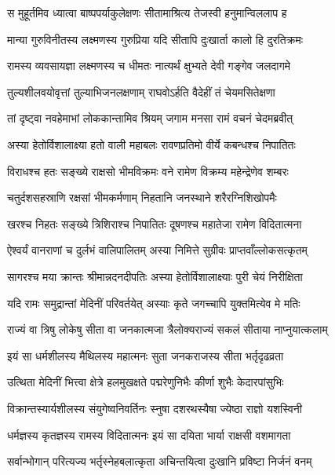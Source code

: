\twolineshloka
{स मुहूर्तमिव ध्यात्वा बाष्पपर्याकुलेक्षणः}
{सीतामाश्रित्य तेजस्वी हनुमान्विललाप ह} %

\twolineshloka
{मान्या गुरुविनीतस्य लक्ष्मणस्य गुरुप्रिया}
{यदि सीतापि दुःखार्ता कालो हि दुरतिक्रमः} %

\twolineshloka
{रामस्य व्यवसायज्ञा लक्ष्मणस्य च धीमतः}
{नात्यर्थं क्षुभ्यते देवी गङ्गेव जलदागमे} %

\twolineshloka
{तुल्यशीलवयोवृत्तां तुल्याभिजनलक्षणाम्}
{राघवोऽर्हति वैदेहीं तं चेयमसितेक्षणा} %

\twolineshloka
{तां दृष्ट्वा नवहेमाभां लोककान्तामिव श्रियम्}
{जगाम मनसा रामं वचनं चेदमब्रवीत्} %

\twolineshloka
{अस्या हेतोर्विशालाक्ष्या हतो वाली महाबलः}
{रावणप्रतिमो वीर्ये कबन्धश्च निपातितः} %

\twolineshloka
{विराधश्च हतः सङ्ख्ये राक्षसो भीमविक्रमः}
{वने रामेण विक्रम्य महेन्द्रेणेव शम्बरः} %

\twolineshloka
{चतुर्दशसहस्राणि रक्षसां भीमकर्मणाम्}
{निहतानि जनस्थाने शरैरग्निशिखोपमैः} %

\twolineshloka
{खरश्च निहतः सङ्ख्ये त्रिशिराश्च निपातितः}
{दूषणश्च महातेजा रामेण विदितात्मना} %

\twolineshloka
{ऐश्वर्यं वानराणां च दुर्लभं वालिपालितम्}
{अस्या निमित्ते सुग्रीवः प्राप्तवाँल्लोकसत्कृतम्} %

\twolineshloka
{सागरश्च मया क्रान्तः श्रीमान्नदनदीपतिः}
{अस्या हेतोर्विशालाक्ष्याः पुरी चेयं निरीक्षिता} %

\twolineshloka
{यदि रामः समुद्रान्तां मेदिनीं परिवर्तयेत्}
{अस्याः कृते जगच्चापि युक्तमित्येव मे मतिः} %

\twolineshloka
{राज्यं वा त्रिषु लोकेषु सीता वा जनकात्मजा}
{त्रैलोक्यराज्यं सकलं सीताया नाप्नुयात्कलाम्} %

\twolineshloka
{इयं सा धर्मशीलस्य मैथिलस्य महात्मनः}
{सुता जनकराजस्य सीता भर्तृदृढव्रता} %

\twolineshloka
{उत्थिता मेदिनीं भित्त्वा क्षेत्रे हलमुखक्षते}
{पद्मरेणुनिभैः कीर्णा शुभैः केदारपांसुभिः} %

\twolineshloka
{विक्रान्तस्यार्यशीलस्य संयुगेष्वनिवर्तिनः}
{स्नुषा दशरथस्यैषा ज्येष्ठा राज्ञो यशस्विनी} %

\twolineshloka
{धर्मज्ञस्य कृतज्ञस्य रामस्य विदितात्मनः}
{इयं सा दयिता भार्या राक्षसी वशमागता} %

\twolineshloka
{सर्वान्भोगान् परित्यज्य भर्तृस्नेहबलात्कृता}
{अचिन्तयित्वा दुःखानि प्रविष्टा निर्जनं वनम्} %

